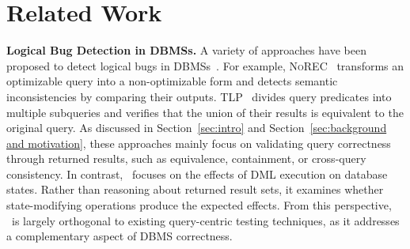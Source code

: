\vspace{-2mm}
\section{Related Work}
\label{sec:Related Work}

\textbf{Logical Bug Detection in DBMSs.}
A variety of approaches have been proposed to detect logical bugs in DBMSs~\cite{rigger2020detecting,rigger2020finding,rigger2020testing,song2023testing,tang2023detecting,jiang2024detecting,song2024detecting,hao2023pinolo,deng2025detecting,ba2024keep,jiang2023detecting}.  
For example, \textsc{NoREC}~\cite{rigger2020detecting} transforms an optimizable query into a non-optimizable form and detects semantic inconsistencies by comparing their outputs.  
\textsc{TLP}~\cite{rigger2020finding} divides query predicates into multiple subqueries and verifies that the union of their results is equivalent to the original query.  
%
As discussed in Section~\ref{sec:intro} and Section~\ref{sec:background and motivation}, these approaches mainly focus on validating query correctness through returned results, such as equivalence, containment, or cross-query consistency. 
In contrast, \toolname\ focuses on the effects of DML execution on database states. 
Rather than reasoning about returned result sets, it examines whether state-modifying operations produce the expected effects. 
From this perspective, \toolname\ is largely orthogonal to existing query-centric testing techniques, as it addresses a complementary aspect of DBMS correctness.



